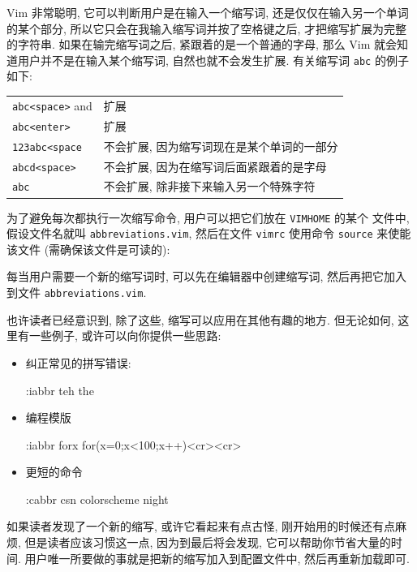 Vim 非常聪明, 它可以判断用户是在输入一个缩写词, 还是仅仅在输入另一个单词
的某个部分, 所以它只会在我输入缩写词并按了空格键之后, 才把缩写扩展为完整
的字符串. 如果在输完缩写词之后, 紧跟着的是一个普通的字母, 那么 Vim 就会知
道用户并不是在输入某个缩写词, 自然也就不会发生扩展. 有关缩写词 \texttt{abc} 
的例子如下:
\begin{center}
\begin{tabular}{ll}
    \hline
    \texttt{abc<space>} and & 扩展 \\
    \texttt{abc<enter>}     & 扩展 \\
    \texttt{123abc<space}   & 不会扩展, 因为缩写词现在是某个单词的一部分 \\
    \texttt{abcd<space>}    & 不会扩展, 因为在缩写词后面紧跟着的是字母 \\
    \texttt{abc}            & 不会扩展, 除非接下来输入另一个特殊字符 \\
    \hline
\end{tabular}
\end{center}

为了避免每次都执行一次缩写命令, 用户可以把它们放在 \texttt{VIMHOME} 的某个 
文件中, 假设文件名就叫 \texttt{abbreviations.vim}, 然后在文件 \texttt{vimrc}
使用命令 \texttt{source} 来使能该文件 (需确保该文件是可读的):

每当用户需要一个新的缩写词时, 可以先在编辑器中创建缩写词, 然后再把它加入到文件
\texttt{abbreviations.vim}.

也许读者已经意识到, 除了这些, 缩写可以应用在其他有趣的地方. 但无论如何,
这里有一些例子, 或许可以向你提供一些思路:
\begin{itemize}
    \item 纠正常见的拼写错误:
    \begin{vimcmd}
    :iabbr teh the
    \end{vimcmd}
    \item 编程模版
    \begin{vimcmd}
    :iabbr forx for(x=0;x<100;x++){<cr><cr>}
    \end{vimcmd}
    \item 更短的命令
    \begin{vimcmd}
    :cabbr csn colorscheme night
    \end{vimcmd}
\end{itemize}

如果读者发现了一个新的缩写, 或许它看起来有点古怪, 刚开始用的时候还有点麻烦,
但是读者应该习惯这一点, 因为到最后将会发现, 它可以帮助你节省大量的时间.
用户唯一所要做的事就是把新的缩写加入到配置文件中, 然后再重新加载即可.


